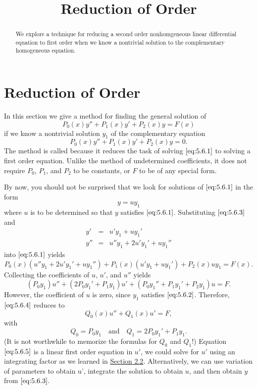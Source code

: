 \documentclass{ximera}
\title{Reduction of Order}
\begin{document}
 
\begin{abstract}
 We explore a technique for reducing a second order nonhomgeneous linear differential equation to first order when we know a nontrivial solution to the complementary homogeneous equation.
\end{abstract}
 
\maketitle
 
\section*{Reduction of Order}
 
In this section we give a method for finding the general
solution of
\begin{equation} \label{eq:5.6.1}
P_0(x)y''+P_1(x)y'+P_2(x)y=F(x)
\end{equation}
if we know  a nontrivial solution $y_1$ of the complementary equation
\begin{equation} \label{eq:5.6.2}
P_0(x)y''+P_1(x)y'+P_2(x)y=0.
\end{equation}
The method is called  because it reduces
the task of solving $\eqref{eq:5.6.1}$ to solving a first order equation.
Unlike the method of undetermined coefficients, it does not require
$P_0$, $P_1$, and $P_2$ to be constants, or $F$ to be of any special form.
 
By now, you should not be surprised that we look for
solutions of $\eqref{eq:5.6.1}$ in the form
\begin{equation} \label{eq:5.6.3}
y=uy_1
\end{equation}
where $u$ is to be determined so that $y$ satisfies $\eqref{eq:5.6.1}$.
Substituting $\eqref{eq:5.6.3}$ and
$$\begin{array}{rcl}
y'&=& u'y_1+uy_1' \\
y''&=& u''y_1+2u'y_1'+uy_1''
\end{array}$$
into $\eqref{eq:5.6.1}$ yields
$$
P_0(x)(u''y_1+2u'y_1'+uy_1'')+P_1(x)(u'y_1+uy_1')+P_2(x)uy_1=F(x).
$$
Collecting the coefficients of $u$, $u'$, and $u''$ yields
\begin{equation} \label{eq:5.6.4}
(P_0y_1)u''+(2P_0y_1'+P_1y_1)u'+(P_0y_1''+P_1y_1'+P_2y_1)
u=F.
\end{equation}
However, the coefficient of $u$ is zero, since $y_1$ satisfies
$\eqref{eq:5.6.2}$. Therefore, $\eqref{eq:5.6.4}$ reduces to
\begin{equation} \label{eq:5.6.5}
Q_0(x)u''+Q_1(x)u'=F,
\end{equation}
with
$$
Q_0=P_0y_1 \quad\mbox{and}\quad Q_1=2P_0y_1'+P_1y_1.
$$
(It is not worthwhile to memorize the formulas for $Q_0$ and $Q_1$!)
Equation $\eqref{eq:5.6.5}$ is a linear first order equation in $u'$, we could solve for $u'$ using an integrating factor as we learned in \href{https://xerxes.ximera.org/differentialequations/main/linearFirstOrderDiffEq/linearFirstOrderDiffEq}{Section 2.2}.  Alternatively, we can use variation of parameters to obtain u', integrate the solution to obtain $u$, and then
obtain $y$ from $\eqref{eq:5.6.3}$.
 
\end{document}
